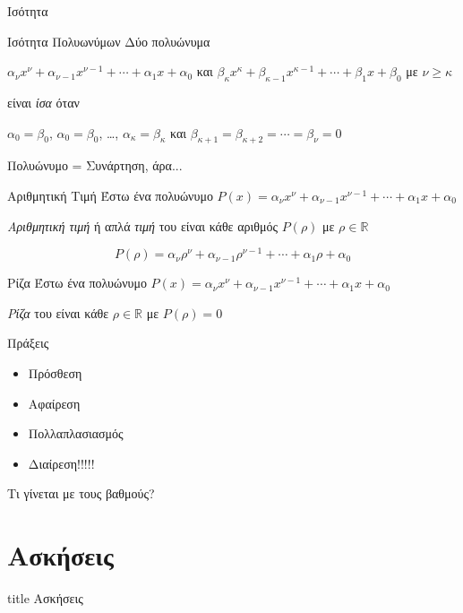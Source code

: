 \documentclass{presentation}
\begin{document}
\begin{frame}{Ισότητα}
  \begin{block}{Ισότητα Πολυωνύμων}
    Δύο πολυώνυμα

    $α_νx^ν+α_{ν-1}x^{ν-1}+\cdots+α_1x+α_0$ και $β_κx^κ+β_{κ-1}x^{κ-1}+\cdots+β_1x+β_0$ με $ν\ge κ$

    είναι \emph{ίσα} όταν

    $α_0=β_0$, $α_0=β_0$, \ldots, $α_κ=β_κ$ και $β_{κ+1}=β_{κ+2}=\cdots=β_ν=0$
  \end{block}
\end{frame}

\begin{frame}{Πολυώνυμο = Συνάρτηση, άρα...}
  \begin{block}{Αριθμητική Τιμή}
    Έστω ένα πολυώνυμο $P(x)=α_νx^ν+α_{ν-1}x^{ν-1}+\cdots+α_1x+α_0$

    \emph{Αριθμητική τιμή} ή απλά \emph{τιμή} του είναι κάθε αριθμός $P(ρ)$ με $ρ\in\mathbb{R}$

    $$P(ρ)=α_νρ^ν+α_{ν-1}ρ^{ν-1}+\cdots+α_1ρ+α_0$$
  \end{block}

  \begin{block}{Ρίζα}
    Έστω ένα πολυώνυμο $P(x)=α_νx^ν+α_{ν-1}x^{ν-1}+\cdots+α_1x+α_0$

    \emph{Ρίζα} του είναι κάθε $ρ\in\mathbb{R}$ με $P(ρ)=0$
  \end{block}
\end{frame}

\begin{frame}{Πράξεις}
  \begin{block}{}
    \begin{itemize}
      \item<1-> Πρόσθεση
      \item<2-> Αφαίρεση
      \item<3-> Πολλαπλασιασμός
      \item<4-> Διαίρεση!!!!!
    \end{itemize}
  \end{block}
   Τι γίνεται με τους βαθμούς?
\end{frame}

\section{Ασκήσεις}

\begin{frame}[noframenumbering]
  \vfill
  \centering
  \begin{beamercolorbox}[sep=8pt,center,shadow=true,rounded=true]{title}
    Ασκήσεις
  \end{beamercolorbox}
  \vfill
\end{frame}
\end{document}
